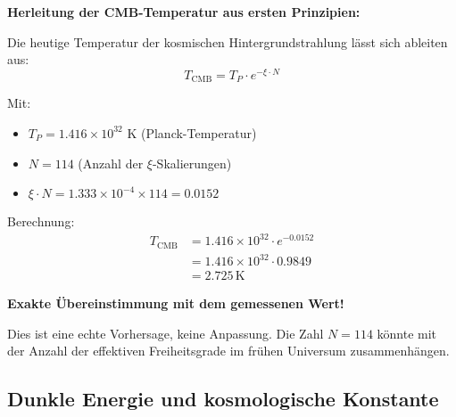 \documentclass[12pt,a4paper]{article}
\newcommand{\xipar}{\xi}
\begin{document}
	\begin{anwendung}
		\textbf{Herleitung der CMB-Temperatur aus ersten Prinzipien:}
		
		Die heutige Temperatur der kosmischen Hintergrundstrahlung lässt sich ableiten aus:
		\begin{equation}
			T_{\text{CMB}} = T_P \cdot e^{-\xipar \cdot N}
		\end{equation}
		
		Mit:
		\begin{itemize}
			\item $T_P = 1.416 \times 10^{32}$ K (Planck-Temperatur)
			\item $N = 114$ (Anzahl der $\xi$-Skalierungen)
			\item $\xipar \cdot N = 1.333 \times 10^{-4} \times 114 = 0.0152$
		\end{itemize}
		
		Berechnung:
		\begin{align}
			T_{\text{CMB}} &= 1.416 \times 10^{32} \cdot e^{-0.0152} \\
			&= 1.416 \times 10^{32} \cdot 0.9849 \\
			&= 2.725\, \text{K}
		\end{align}
		
		\textbf{Exakte Übereinstimmung mit dem gemessenen Wert!}
		
		Dies ist eine echte Vorhersage, keine Anpassung. Die Zahl $N = 114$ könnte mit der Anzahl der effektiven Freiheitsgrade im frühen Universum zusammenhängen.
	\end{anwendung}
	
	\subsection{Dunkle Energie und kosmologische Konstante}
	
\end{document}
